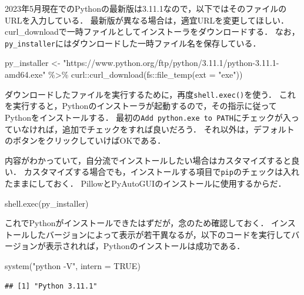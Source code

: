 \documentclass[
]{article}
\newenvironment{Shaded}{\begin{snugshade}}{\end{snugshade}}
\newcommand{\AttributeTok}[1]{\textcolor[rgb]{0.77,0.63,0.00}{#1}}
\newcommand{\ConstantTok}[1]{\textcolor[rgb]{0.00,0.00,0.00}{#1}}
\newcommand{\FunctionTok}[1]{\textcolor[rgb]{0.00,0.00,0.00}{#1}}
\newcommand{\NormalTok}[1]{#1}
\newcommand{\OtherTok}[1]{\textcolor[rgb]{0.56,0.35,0.01}{#1}}
\newcommand{\SpecialCharTok}[1]{\textcolor[rgb]{0.00,0.00,0.00}{#1}}
\newcommand{\StringTok}[1]{\textcolor[rgb]{0.31,0.60,0.02}{#1}}
\begin{document}
2023年5月現在でのPythonの最新版は3.11.1なので，以下ではそのファイルのURLを入力している．
最新版が異なる場合は，適宜URLを変更してほしい．
curl\_downloadで一時ファイルとしてインストーラをダウンロードする．
なお，\texttt{py\_installer}にはダウンロードした一時ファイル名を保存している．

\begin{Shaded}
\begin{Highlighting}[]
\NormalTok{py\_installer }\OtherTok{\textless{}{-}} 
  \StringTok{"https://www.python.org/ftp/python/3.11.1/python{-}3.11.1{-}amd64.exe"} \SpecialCharTok{\%\textgreater{}\%}
\NormalTok{  curl}\SpecialCharTok{::}\FunctionTok{curl\_download}\NormalTok{(fs}\SpecialCharTok{::}\FunctionTok{file\_temp}\NormalTok{(}\AttributeTok{ext =} \StringTok{"exe"}\NormalTok{))}
\end{Highlighting}
\end{Shaded}

ダウンロードしたファイルを実行するために，再度\texttt{shell.exec()}を使う．
これを実行すると，Pythonのインストーラが起動するので，その指示に従ってPythonをインストールする．
最初の\texttt{Add\ python.exe\ to\ PATH}にチェックが入っていなければ，追加でチェックをすれば良いだろう．
それ以外は，デフォルトのボタンをクリックしていけばOKである．

内容がわかっていて，自分流でインストールしたい場合はカスタマイズすると良い．
カスタマイズする場合でも，インストールする項目で\texttt{pip}のチェックは入れたままにしておく．
PillowとPyAutoGUIのインストールに使用するからだ．

\begin{Shaded}
\begin{Highlighting}[]
\FunctionTok{shell.exec}\NormalTok{(py\_installer)}
\end{Highlighting}
\end{Shaded}

これでPythonがインストールできたはずだが，念のため確認しておく．
インストールしたバージョンによって表示が若干異なるが，以下のコードを実行してバージョンが表示されれば，Pythonのインストールは成功である．

\begin{Shaded}
\begin{Highlighting}[]
\FunctionTok{system}\NormalTok{(}\StringTok{"python {-}V"}\NormalTok{, }\AttributeTok{intern =} \ConstantTok{TRUE}\NormalTok{)}
\end{Highlighting}
\end{Shaded}

\begin{verbatim}
## [1] "Python 3.11.1"
\end{verbatim}
\end{document}
